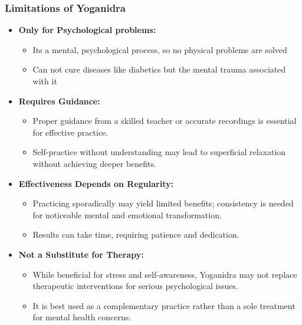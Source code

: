 \begin{frame}[fragile]\frametitle{Limitations of Yoganidra}
    \begin{itemize}
	    \item \textbf{Only for Psychological problems:} 
			\begin{itemize}
				\item Its a mental, psychological process, so no physical problems are solved
				\item Can not cure diseases like diabetics but the mental trauma associated with it
			\end{itemize}
			
        \item \textbf{Requires Guidance:} 
            \begin{itemize}
                \item Proper guidance from a skilled teacher or accurate recordings is essential for effective practice.
                \item Self-practice without understanding may lead to superficial relaxation without achieving deeper benefits.
            \end{itemize}
        

        \item \textbf{Effectiveness Depends on Regularity:}
            \begin{itemize}
                \item Practicing sporadically may yield limited benefits; consistency is needed for noticeable mental and emotional transformation.
                \item Results can take time, requiring patience and dedication.
            \end{itemize}
        
        \item \textbf{Not a Substitute for Therapy:}
            \begin{itemize}
                \item While beneficial for stress and self-awareness, Yoganidra may not replace therapeutic interventions for serious psychological issues.
                \item It is best used as a complementary practice rather than a sole treatment for mental health concerns.
            \end{itemize}
        

\end{itemize}
\end{frame}
